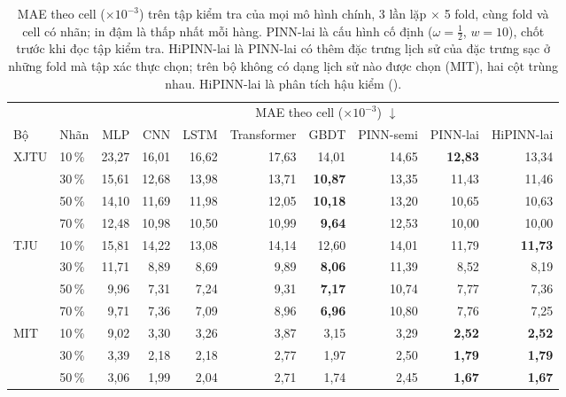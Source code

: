 \begin{table}[!htbp]\centering\footnotesize
\caption[MAE theo cell của mọi mô hình chính]{MAE theo cell ($\times10^{-3}$) trên tập kiểm tra của mọi mô hình chính, 3 lần lặp $\times$ 5 fold, cùng fold và cell có nhãn; in đậm là thấp nhất mỗi hàng. PINN-lai là cấu hình cố định ($\omega = \tfrac12$, $w = 10$), chốt trước khi đọc tập kiểm tra. HiPINN-lai là PINN-lai có thêm đặc trưng lịch sử của đặc trưng sạc ở những fold mà tập xác thực chọn; trên bộ không có dạng lịch sử nào được chọn (MIT), hai cột trùng nhau. HiPINN-lai là phân tích hậu kiểm ().}\label{tab:allmae}
\begin{adjustbox}{max width=\textwidth}\begin{tabular}{llrrrrrrrr}\toprule
 & & \multicolumn{8}{c}{MAE theo cell ($\times10^{-3}$) $\downarrow$} \\\cmidrule(lr){3-10}
Bộ & Nhãn & MLP & CNN & LSTM & Transformer & GBDT & PINN-semi & PINN-lai & HiPINN-lai \\\midrule
XJTU & 10\,\% & 23{,}27 & 16{,}01 & 16{,}62 & 17{,}63 & 14{,}01 & 14{,}65 & \textbf{12{,}83} & 13{,}34 \\
 & 30\,\% & 15{,}61 & 12{,}68 & 13{,}98 & 13{,}71 & \textbf{10{,}87} & 13{,}35 & 11{,}43 & 11{,}46 \\
 & 50\,\% & 14{,}10 & 11{,}69 & 11{,}98 & 12{,}05 & \textbf{10{,}18} & 13{,}20 & 10{,}65 & 10{,}63 \\
 & 70\,\% & 12{,}48 & 10{,}98 & 10{,}50 & 10{,}99 & \textbf{9{,}64} & 12{,}53 & 10{,}00 & 10{,}00 \\
TJU & 10\,\% & 15{,}81 & 14{,}22 & 13{,}08 & 14{,}14 & 12{,}60 & 14{,}01 & 11{,}79 & \textbf{11{,}73} \\
 & 30\,\% & 11{,}71 & 8{,}89 & 8{,}69 & 9{,}89 & \textbf{8{,}06} & 11{,}39 & 8{,}52 & 8{,}19 \\
 & 50\,\% & 9{,}96 & 7{,}31 & 7{,}24 & 9{,}31 & \textbf{7{,}17} & 10{,}74 & 7{,}77 & 7{,}36 \\
 & 70\,\% & 9{,}71 & 7{,}36 & 7{,}09 & 8{,}96 & \textbf{6{,}96} & 10{,}80 & 7{,}76 & 7{,}25 \\
MIT & 10\,\% & 9{,}02 & 3{,}30 & 3{,}26 & 3{,}87 & 3{,}15 & 3{,}29 & \textbf{2{,}52} & \textbf{2{,}52} \\
 & 30\,\% & 3{,}39 & 2{,}18 & 2{,}18 & 2{,}77 & 1{,}97 & 2{,}50 & \textbf{1{,}79} & \textbf{1{,}79} \\
 & 50\,\% & 3{,}06 & 1{,}99 & 2{,}04 & 2{,}71 & 1{,}74 & 2{,}45 & \textbf{1{,}67} & \textbf{1{,}67} \\

\end{tabular}
\end{adjustbox}
\end{table}
